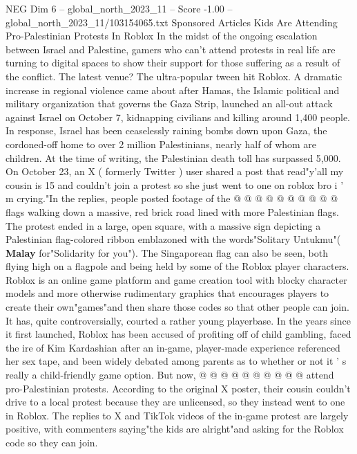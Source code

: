 \begin{textsample}{NEG Dim 6 – global\_north\_2023\_11 – Score -1.00 – global\_north\_2023\_11/103154065.txt}  \label{ex:f6_neg_202}
Sponsored Articles Kids Are Attending Pro-Palestinian Protests In Roblox In the midst of the ongoing escalation between Israel and Palestine, gamers who can't attend protests in real life are turning to digital spaces to show their support for those suffering as a result of the conflict.
The latest venue?
The ultra-popular tween hit Roblox.
A dramatic increase in regional violence came about after Hamas, the Islamic political and military organization that governs the Gaza Strip, launched an all-out attack against Israel on October 7, kidnapping civilians and killing around 1,400 people.
In response, Israel has been ceaselessly raining bombs down upon Gaza, the cordoned-off home to over 2 million Palestinians, nearly half of whom are children.
At the time of writing, the Palestinian death toll has surpassed 5,000.
On October 23, an X ( formerly Twitter ) user shared a post that read"y'all my cousin is 15 and couldn't join a protest so she just went to one on roblox bro i ' m crying."In the replies, people posted footage of the @ @ @ @ @ @ @ @ @ @ flags walking down a massive, red brick road lined with more Palestinian flags.
The protest ended in a large, open square, with a massive sign depicting a Palestinian flag-colored ribbon emblazoned with the words"Solitary Untukmu"( \textbf{Malay} for"Solidarity for you").
The Singaporean flag can also be seen, both flying high on a flagpole and being held by some of the Roblox player characters.
Roblox is an online game platform and game creation tool with blocky character models and more otherwise rudimentary graphics that encourages players to create their own"games"and then share those codes so that other people can join.
It has, quite controversially, courted a rather young playerbase.
In the years since it first launched, Roblox has been accused of profiting off of child gambling, faced the ire of Kim Kardashian after an in-game, player-made experience referenced her sex tape, and been widely debated among parents as to whether or not it ' s really a child-friendly game option.
But now, @ @ @ @ @ @ @ @ @ @ attend pro-Palestinian protests.
According to the original X poster, their cousin couldn't drive to a local protest because they are unlicensed, so they instead went to one in Roblox.
The replies to X and TikTok videos of the in-game protest are largely positive, with commenters saying"the kids are alright"and asking for the Roblox code so they can join.

\end{textsample}
